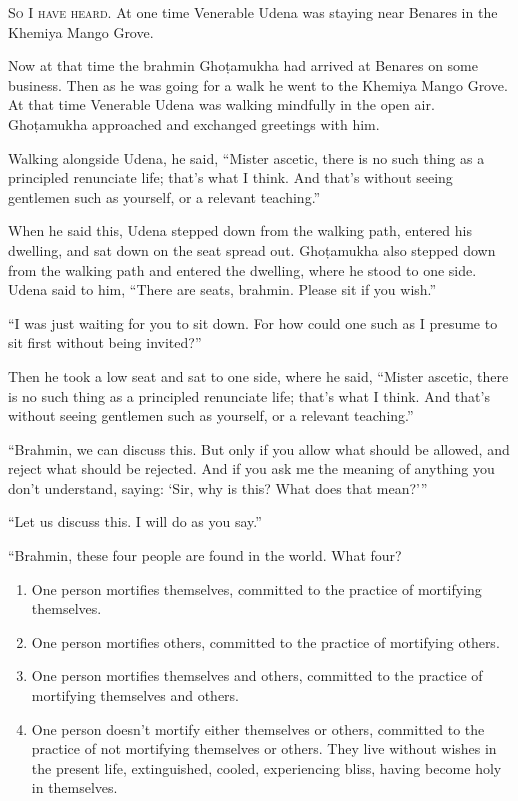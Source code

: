 \documentclass[12pt,openany]{book}%
\newcommand*{\scevam}[1]{\textsc{#1}}
\begin{document}
\scevam{So I have heard. }At one time Venerable Udena was staying near Benares in the Khemiya Mango Grove. 

Now at that time the brahmin \textsanskrit{Ghoṭamukha} had arrived at Benares on some business. Then as he was going for a walk he went to the Khemiya Mango Grove. At that time Venerable Udena was walking mindfully in the open air. \textsanskrit{Ghoṭamukha} approached and exchanged greetings with him. 

Walking alongside Udena, he said, “Mister ascetic, there is no such thing as a principled renunciate life; that’s what I think. And that’s without seeing gentlemen such as yourself, or a relevant teaching.” 

When he said this, Udena stepped down from the walking path, entered his dwelling, and sat down on the seat spread out. \textsanskrit{Ghoṭamukha} also stepped down from the walking path and entered the dwelling, where he stood to one side. Udena said to him, “There are seats, brahmin. Please sit if you wish.” 

“I was just waiting for you to sit down. For how could one such as I presume to sit first without being invited?” 

Then he took a low seat and sat to one side, where he said, “Mister ascetic, there is no such thing as a principled renunciate life; that’s what I think. And that’s without seeing gentlemen such as yourself, or a relevant teaching.” 

“Brahmin, we can discuss this. But only if you allow what should be allowed, and reject what should be rejected. And if you ask me the meaning of anything you don’t understand, saying: ‘Sir, why is this? What does that mean?’” 

“Let us discuss this. I will do as you say.” 

“Brahmin, these four people are found in the world. What four? 

\begin{enumerate}%
\item One person mortifies themselves, committed to the practice of mortifying themselves. %
\item One person mortifies others, committed to the practice of mortifying others. %
\item One person mortifies themselves and others, committed to the practice of mortifying themselves and others. %
\item One person doesn’t mortify either themselves or others, committed to the practice of not mortifying themselves or others. They live without wishes in the present life, extinguished, cooled, experiencing bliss, having become holy in themselves. %
\end{enumerate}
\end{document}
